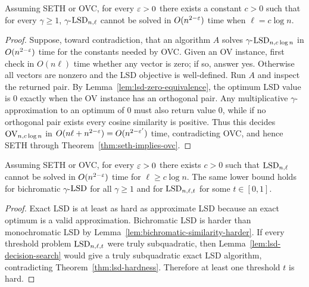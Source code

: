 \begin{theorem}
  \label{thm:lsd-hardness}
  Assuming SETH or OVC, for every $\varepsilon>0$ there exists a constant $c>0$ such
  that for every $\gamma\geq1$, $\gamma$-$\mathrm{LSD}_{n,\ell}$ cannot be solved in
  $O(n^{2-\varepsilon})$ time when $\ell=c\log n$.
\end{theorem}
\begin{proof}
  Suppose, toward contradiction, that an algorithm $A$ solves
  $\gamma$-$\mathrm{LSD}_{n,c\log n}$ in $O(n^{2-\varepsilon})$ time for the constants needed
  by OVC.  Given an OV instance, first check in $O(n\ell)$ time whether any
  vector is zero; if so, answer yes.  Otherwise all vectors are nonzero and the
  LSD objective is well-defined.  Run $A$ and inspect the returned pair.  By
  Lemma~\ref{lem:lsd-zero-equivalence}, the optimum LSD value is $0$ exactly
  when the OV instance has an orthogonal pair.  Any multiplicative
  $\gamma$-approximation to an optimum of $0$ must also return value $0$, while
  if no orthogonal pair exists every cosine similarity is positive.  Thus this
  decides $\mathrm{OV}_{n,c\log n}$ in $O(n\ell+n^{2-\varepsilon})=O(n^{2-\varepsilon'})$ time,
  contradicting OVC, and hence SETH through Theorem~\ref{thm:seth-implies-ovc}.
\end{proof}

\begin{corollary}
  \label{cor:lsd-hardness-variants}
  Assuming SETH or OVC, for every $\varepsilon>0$ there exists $c>0$ such that
  $\mathrm{LSD}_{n,\ell}$ cannot be solved in $O(n^{2-\varepsilon})$ time for $\ell\geq
  c\log n$.  The same lower bound holds for bichromatic $\gamma$-$\mathrm{LSD}$ for all
  $\gamma\geq1$ and for $\mathrm{LSD}_{n,\ell,t}$ for some $t\in[0,1]$.
\end{corollary}
\begin{proof}
  Exact LSD is at least as hard as approximate LSD because an exact optimum is a
  valid approximation.  Bichromatic LSD is harder than monochromatic LSD by
  Lemma~\ref{lem:bichromatic-similarity-harder}.  If every threshold problem
  $\mathrm{LSD}_{n,\ell,t}$ were truly subquadratic, then
  Lemma~\ref{lem:lsd-decision-search} would give a truly subquadratic exact LSD
  algorithm, contradicting Theorem~\ref{thm:lsd-hardness}.  Therefore at least
  one threshold $t$ is hard.
\end{proof}

